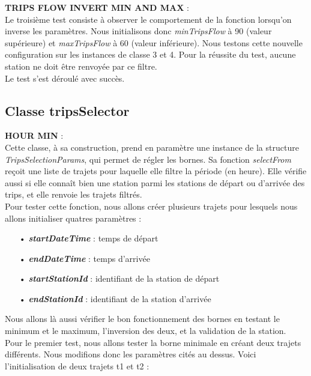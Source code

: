 \documentclass[12pt]{article}
\begin{document}
		\textbf{TRIPS FLOW INVERT MIN AND MAX} :\\
		Le troisième test consiste à observer le comportement de la fonction lorsqu’on inverse les paramètres. Nous initialisons donc \textit{minTripsFlow} à 90 (valeur supérieure) et \textit{maxTripsFlow} à 60 (valeur inférieure). Nous testons cette nouvelle configuration sur les instances de classe 3 et 4. Pour la réussite du test, aucune station ne doit être renvoyée par ce filtre.\\
	
	Le test s’est déroulé avec succès.
	
	\subsection{Classe tripsSelector}
	\textbf{HOUR MIN} :\\
	Cette classe, à sa construction, prend en paramètre une instance de la structure \textit{TripsSelectionParams}, qui permet de régler les bornes. Sa fonction \textit{selectFrom} reçoit une liste de trajets pour laquelle elle filtre la période (en heure). Elle vérifie aussi si elle connaît bien une station parmi les stations de départ ou d’arrivée des trips, et elle renvoie les trajets filtrés.\\
Pour tester cette fonction, nous allons créer plusieurs trajets pour lesquels nous allons initialiser quatres paramètres :\\
	\begin{itemize}
	\item[•] \textbf{\textit{startDateTime}} : temps de départ
	\item[•] \textbf{\textit{endDateTime}} :  temps d’arrivée 
	\item[•] \textbf{\textit{startStationId}} : identifiant de la station de départ
	\item[•] \textbf{\textit{endStationId}} : identifiant de la station d’arrivée\\
	\end{itemize}
	
	Nous allons là aussi vérifier le bon fonctionnement des bornes en testant le minimum et le maximum, l’inversion des deux, et la validation de la station.\\

Pour le premier test, nous allons tester la borne minimale en créant deux trajets différents. Nous modifions donc les paramètres cités au dessus. Voici l’initialisation de deux trajets t1 et t2 :\\ \\
\end{document}

